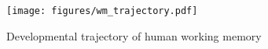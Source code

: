 \begin{figure}[t]
 \centering
  \texttt{[image: figures/wm\_trajectory.pdf]}
 \caption{Developmental trajectory of human working memory}
 \label{fig:trajectory}
\end{figure}